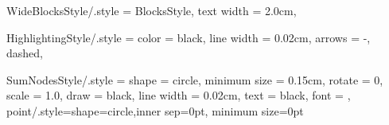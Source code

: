 \tikzset
{
	WideBlocksStyle/.style =
	{
		BlocksStyle,
		text width		= 2.0cm,				%
	}
}

\tikzset
{
	HighlightingStyle/.style =
	{
		color				= black,	%
		line width			= 0.02cm,			%
		arrows				= -,				%
		dashed,
	}
}

\tikzset
{
	SumNodesStyle/.style =
	{
		shape			= circle,				%
		minimum size	= 0.15cm,				%
		rotate			= 0,					%
		scale			= 1.0,					%
		draw			= black,				%
		line width		= 0.02cm,				%
		text			= black,				%
		font			= \normalsize\normalfont,	%
	}
}
\tikzset
{
    point/.style={shape=circle,inner sep=0pt, minimum size=0pt}
}

\newcommand{\plotfun}[3][6cm]{
    \begin{tikzpicture}
        \begin{axis}
        [width=#1,grid=major,samples=100,mark=none]
        \addplot[blue,very thick,domain=#3]
        {#2};
        \end{axis}
    \end{tikzpicture}
}

\newcommand{\gnuplotfun}[3][6cm]{
    \begin{tikzpicture}
        \begin{axis}
        [width=#1,grid=major, samples=100,mark=none]
        \addplot[blue,very thick,domain=#3]
        gnuplot{#2};
        \end{axis}
    \end{tikzpicture}
}
